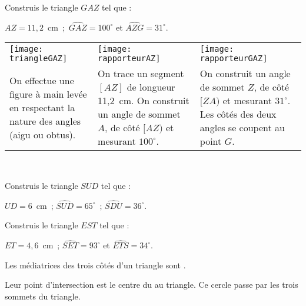 \begin{methode*1}

 \begin{exemple*1}
Construis le triangle $GAZ$ tel que :

$AZ = 11,2$ cm ; $\widehat{GAZ} = 100^\circ$ et $\widehat{AZG} = 31^\circ$. \\[1em]
\begin{tabularx}{\textwidth}{X|X|X}
 \texttt{[image: triangleGAZ]} &  \texttt{[image: rapporteurAZ]} & \texttt{[image: rapporteurGAZ]} \\ 
 On effectue une figure à main levée en respectant la nature des angles (aigu ou obtus). & On trace un segment $[AZ]$ de longueur 11,2 cm. On construit un angle de sommet $A$, de côté $[AZ)$ et mesurant $100^\circ$. & On construit un angle de sommet $Z$, de côté $[ZA)$ et mesurant $31^\circ$. Les côtés des deux angles se coupent au point $G$. \\
\end{tabularx} \\

\end{exemple*1}

\exercice
Construis le triangle $SUD$ tel que :

$UD = 6$ cm ; $\widehat{SUD} = 65^\circ$ ; $\widehat{SDU} = 36^\circ$.
\vspace{4cm}

\exercice
Construis le triangle $EST$ tel que :

$ET = 4,6$ cm ; $\widehat{SET} = 93^\circ$ et $\widehat{ETS} = 34^\circ$.
\vspace{2cm}
 
\end{methode*1}



\newpage


 \begin{aconnaitre}
Les médiatrices des trois côtés d'un triangle sont .

Leur point d'intersection est le centre du  au triangle. Ce cercle passe par les trois sommets du triangle.
\end{aconnaitre}

